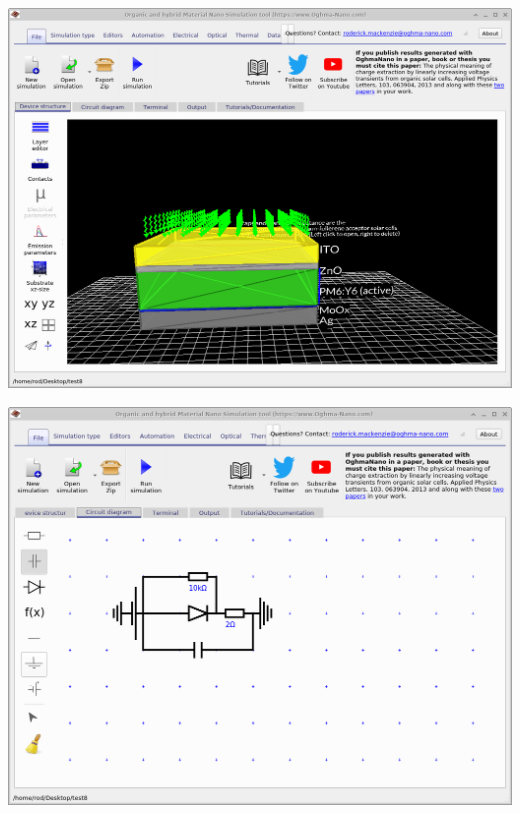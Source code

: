 \noindent
\begin{minipage}{0.5\textwidth}
	\centering
	\includegraphics[width=\linewidth,height=0.8\linewidth]{./images/circuit/example_device_sim.png}
	\label{fig:circuit_example_device_sim}
\end{minipage}
\hspace{4pt}
\begin{minipage}[]{0.5\linewidth}
	\centering
	\includegraphics[width=\linewidth,height=0.8\linewidth]{./images/circuit/example_circuit.png}
	\label{fig:circuit_example_circuit}
\end{minipage}

